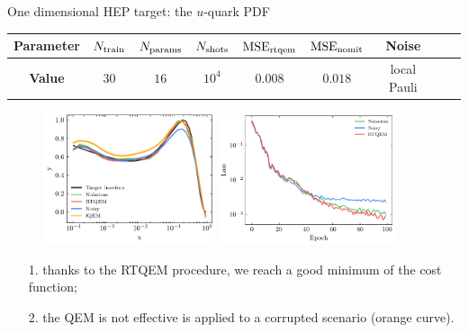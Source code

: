 \documentclass[8pt, xcolor={svgnames}, hyperref={linkcolor=black}, aspectratio=169]{beamer}
\begin{document}
\begin{frame}{One dimensional HEP target: the $u$-quark PDF}

\begin{center}
\footnotesize
\begin{tabular}{ccccccccc}
\hline \hline 
\rule{0pt}{2.5ex}
\textbf{Parameter} & $N_{\rm train}$ & $N_{\rm params}$ & $N_{\rm shots}$ 
& $\text{MSE}_{\rm rtqem}$ &  $\text{MSE}_{\rm nomit}$ & Noise \\
\hline
\rule{0pt}{2.5ex}
\textbf{Value} & $30$ & $16$ & $10^{4}$ &  $0.008$ & $0.018$ & local Pauli \\
\hline \hline 
\end{tabular}
\end{center}

\begin{figure}
    \includegraphics[width=0.45\textwidth]{figures/qpdf.pdf}%
    \includegraphics[width=0.46\textwidth]{figures/qpdf_loss.pdf}
\end{figure}
\begin{itemize}[noitemsep]
\item[1.] thanks to the RTQEM procedure, we reach a good minimum of the cost function;
\item[2.] the QEM is not effective is applied to a corrupted scenario (orange curve).
\end{itemize}
\end{frame}
\end{document}
